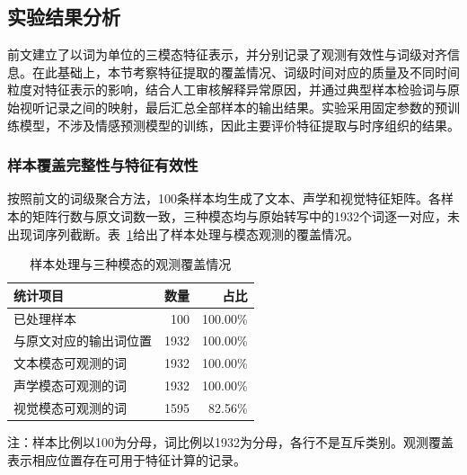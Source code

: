 \subsection{实验结果分析}
\label{sec:p1_results}
\newsavebox{\pOneResultTableBox}

前文建立了以词为单位的三模态特征表示，并分别记录了观测有效性与词级对齐信息。在此基础上，本节考察特征提取的覆盖情况、词级时间对应的质量及不同时间粒度对特征表示的影响，结合人工审核解释异常原因，并通过典型样本检验词与原始视听记录之间的映射，最后汇总全部样本的输出结果。实验采用固定参数的预训练模型，不涉及情感预测模型的训练，因此主要评价特征提取与时序组织的结果。

\subsubsection{样本覆盖完整性与特征有效性}
\label{sec:p1_quality_scope}

按照前文的词级聚合方法，100条样本均生成了文本、声学和视觉特征矩阵。各样本的矩阵行数与原文词数一致，三种模态均与原始转写中的1932个词逐一对应，未出现词序列截断。表~\ref{tab:p1_result_overview}给出了样本处理与模态观测的覆盖情况。

\begin{table}[H]
    \centering\small
    \caption{样本处理与三种模态的观测覆盖情况}
    \label{tab:p1_result_overview}
    \renewcommand{\arraystretch}{1.18}
    \begin{lrbox}{\pOneResultTableBox}
\begin{tabular}{@{}lrr@{}}
        \hline
        统计项目 & 数量 & 占比\\ \hline
        已处理样本 & 100 & 100.00\%\\
        与原文对应的输出词位置 & 1932 & 100.00\%\\
        文本模态可观测的词 & 1932 & 100.00\%\\
        声学模态可观测的词 & 1932 & 100.00\%\\
        视觉模态可观测的词 & 1595 & 82.56\%\\
        \hline
    \end{tabular}
\end{lrbox}
\usebox{\pOneResultTableBox}
    \par\smallskip
    \parbox{\wd\pOneResultTableBox}{\footnotesize 注：样本比例以100为分母，词比例以1932为分母，各行不是互斥类别。观测覆盖表示相应位置存在可用于特征计算的记录。}
\end{table}

